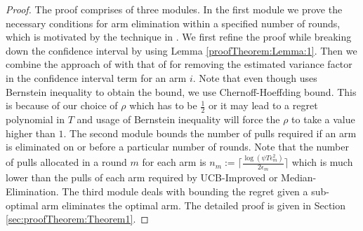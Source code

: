 \begin{proof}
The proof comprises of three modules. In the first module we prove the necessary conditions for arm elimination within a specified number of rounds, which is motivated by the technique in \cite{auer2010ucb}. We first refine the proof while breaking down the confidence interval by using Lemma  \ref{proofTheorem:Lemma:1}. Then we combine the approach of \citet{audibert2009exploration} with that of  \citet{auer2010ucb} for removing the estimated variance factor in the confidence interval term for an arm $i$. Note that even though \citet{audibert2009exploration} uses Bernstein inequality to obtain the  bound, we use Chernoff-Hoeffding bound. This is because of our choice of $\rho$ which has to be $\frac{1}{2}$ or it may lead to a regret polynomial in $T$ and usage of Bernstein inequality will force the $\rho$ to take a value higher than $1$. The second module bounds the number of pulls required if an arm is eliminated on or before a particular number of rounds. Note that the number of pulls allocated in a round $m$ for each arm is $n_{m}:=\bigg\lceil\frac{\log{(\psi T\epsilon_{m}^{2})}}{2\epsilon_{m}}\bigg\rceil$ which is much lower than the pulls of each arm required by UCB-Improved or Median-Elimination. The third module deals with bounding the regret given a sub-optimal arm eliminates the optimal arm. The detailed proof is given in Section \ref{sec:proofTheorem:Theorem1}.
\end{proof}



